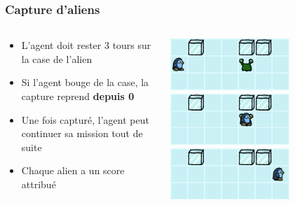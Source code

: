 \documentclass{beamer}
\begin{document}
\begin{frame}
    \frametitle{Capture d'aliens}
    \begin{columns}[T]
    \begin{column}{0.5\textwidth}
        \begin{itemize}
            \item L'agent doit rester 3 tours sur la case de l'alien
            \item Si l'agent bouge de la case, la capture reprend \textbf{depuis 0}
            \item Une fois capturé, l'agent peut continuer sa mission tout de suite
            \item Chaque alien a un score attribué
        \end{itemize}
    \end{column}
    \begin{column}{0.5\textwidth}
        \centering
        \includegraphics[width=4.5cm]{../img/alien_capture1}
        \vspace{0.5cm}
        \includegraphics[width=4.5cm]{../img/alien_capture2}
        \vspace{0.5cm}
        \includegraphics[width=4.5cm]{../img/alien_capture3}
    \end{column}
    \end{columns}    
\end{frame}
\end{document}
